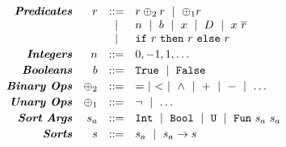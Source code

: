 $$
\begin{array}{rrcl}
\emphbf{Predicates}
  & \pred & ::= &
    \pred \binop \pred \spmid
    \unop \pred \\
  && \spmid & n \spmid b \spmid x \spmid \dc \spmid  x\ \overline{\pred}\\
  && \spmid & \eif{\pred}{\pred}{\pred}
\\[0.03in]

\emphbf{Integers}
  & n
  & ::= & 0, -1, 1, \dots
\\[0.03in]

\emphbf{Booleans}
  & b
  & ::= & \etrue \spmid \efalse
\\[0.03in]

\emphbf{Binary Ops}
  & \binop
  & ::= & = \spmid < \spmid \land \spmid + \spmid - \spmid \dots
\\[0.03in]

\emphbf{Unary Ops}
  & \unop
  & ::= & \lnot \spmid \dots
\\[0.03in]

\emphbf{Sort Args}
  & \sort_a
  & ::= & \tint \spmid \tbool \spmid \tuniv
         \spmid \tsmtfun{\sort_a}{\sort_a}
\\[0.03in]
\emphbf{Sorts}
  & \sort
  & ::=  & \sort_a \spmid \sort_a \rightarrow \sort
\end{array}
$$
\caption{\textbf{Syntax of \smtlan}}
\label{fig:smtsyntax}
